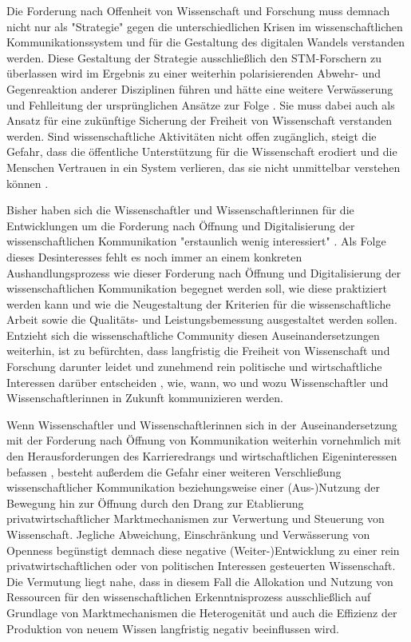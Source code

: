 Die Forderung nach Offenheit von Wissenschaft und Forschung muss demnach nicht nur als "Strategie" gegen die unterschiedlichen Krisen im wissenschaftlichen Kommunikationssystem und für die Gestaltung des digitalen Wandels verstanden werden. Diese Gestaltung der Strategie ausschließlich den STM-Forschern zu überlassen wird im Ergebnis zu einer weiterhin polarisierenden Abwehr- und Gegenreaktion anderer Disziplinen führen und hätte eine weitere Verwässerung und Fehlleitung der ursprünglichen Ansätze zur Folge \cite{Naeder_2010}. Sie muss dabei auch als Ansatz für eine zukünftige Sicherung der Freiheit von Wissenschaft verstanden werden. Sind wissenschaftliche Aktivitäten nicht offen zugänglich, steigt die Gefahr, dass die öffentliche Unterstützung für die Wissenschaft erodiert und die Menschen Vertrauen in ein System verlieren, das sie nicht unmittelbar verstehen können \cite{Resnik_2005}.

Bisher haben sich die Wissenschaftler und Wissenschaftlerinnen für die Entwicklungen um die Forderung nach Öffnung und Digitalisierung der wissenschaftlichen Kommunikation "erstaunlich wenig interessiert" \cite{hagner_2015_sache_buches}. Als Folge dieses Desinteresses fehlt es noch immer an einem konkreten Aushandlungsprozess wie dieser Forderung nach Öffnung und Digitalisierung der wissenschaftlichen Kommunikation begegnet werden soll, wie diese praktiziert werden kann und wie die Neugestaltung der Kriterien für die wissenschaftliche Arbeit sowie die Qualitäts- und Leistungsbemessung ausgestaltet werden sollen. Entzieht sich die wissenschaftliche Community diesen Auseinandersetzungen weiterhin, ist zu befürchten, dass langfristig die Freiheit von Wissenschaft und Forschung darunter leidet und zunehmend rein politische und wirtschaftliche Interessen darüber entscheiden \cite{Warnke_2012}, wie, wann, wo und wozu Wissenschaftler und Wissenschaftlerinnen in Zukunft kommunizieren werden.

Wenn Wissenschaftler und Wissenschaftlerinnen sich in der Auseinandersetzung mit der Forderung nach Öffnung von Kommunikation weiterhin vornehmlich mit den Herausforderungen des Karrieredrangs und wirtschaftlichen Eigeninteressen befassen \cite{Resnik_2005}, besteht außerdem die Gefahr einer weiteren Verschließung wissenschaftlicher Kommunikation beziehungsweise einer (Aus-)Nutzung der Bewegung hin zur Öffnung durch den Drang zur Etablierung privatwirtschaftlicher Marktmechanismen zur Verwertung und Steuerung von Wissenschaft. Jegliche Abweichung, Einschränkung und Verwässerung von Openness begünstigt demnach diese negative (Weiter-)Entwicklung zu einer rein privatwirtschaftlichen oder von politischen Interessen gesteuerten Wissenschaft. Die Vermutung liegt nahe, dass in diesem Fall die Allokation und Nutzung von Ressourcen für den wissenschaftlichen Erkenntnisprozess ausschließlich auf Grundlage von Marktmechanismen die Heterogenität und auch die Effizienz der Produktion von neuem Wissen langfristig negativ beeinflussen wird.

